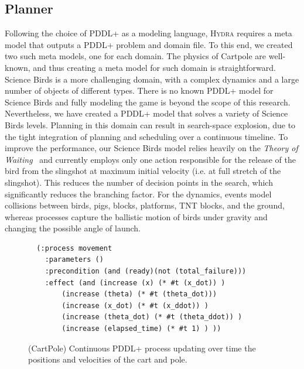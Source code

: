 \documentclass[sigconf]{aamas}
\newcommand{\sbirds}{Science Birds\xspace} %
\newcommand{\hydra}{\textsc{Hydra}\xspace} %
\begin{document}
\subsection{Planner}
Following the choice of PDDL+ as a modeling language, \hydra requires a meta model that outputs a PDDL+ problem and domain file. To this end, we created two such meta models, one for each domain. 
The physics of Cartpole are well-known, and thus creating a meta model for such domain is straightforward.
\sbirds is a more challenging domain, with a complex dynamics and a large number of objects of different types. 
There is no known PDDL+ model for \sbirds and fully modeling the game is beyond the scope of this research. 
Nevertheless, we have created a PDDL+ model that solves a variety of \sbirds levels. 
Planning in this domain can result in search-space explosion, due to the tight integration of planning and scheduling over a continuous timeline. To improve the performance, our \sbirds model relies heavily on the \emph{Theory of Waiting}~\cite{mcdermott2003reasoning} and currently employs only one action responsible for the release of the bird from the slingshot at maximum initial velocity (i.e. at full stretch of the slingshot). This reduces the number of decision points in the search, which significantly reduces the branching factor. For the dynamics, events model collisions between birds, pigs, blocks, platforms, TNT blocks, and the ground, whereas processes capture the ballistic motion of birds under gravity and changing the possible angle of launch. 



\begin{figure}
\begin{center}
    \fontsize{8pt}{10pt}\selectfont
\begin{verbatim}
  (:process movement
    :parameters ()
    :precondition (and (ready)(not (total_failure)))
    :effect (and (increase (x) (* #t (x_dot)) )
        (increase (theta) (* #t (theta_dot)))
        (increase (x_dot) (* #t (x_ddot)) )
        (increase (theta_dot) (* #t (theta_ddot)) )
        (increase (elapsed_time) (* #t 1) ) ))
\end{verbatim}
\caption{(CartPole) Continuous PDDL+ process updating over time the positions and velocities of the cart and pole.}
\label{fig:process-cartpole}
\end{center}
\end{figure}
\end{document}
